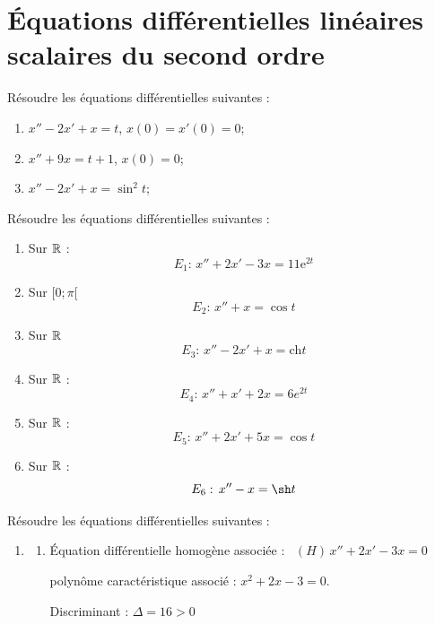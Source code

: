 \documentclass{book}
\begin{document}
\section*{Équations différentielles linéaires scalaires du second ordre}
\begin{Exercice}
Résoudre les équations différentielles suivantes :
\begin{enumerate}
\item $x''-2x'+x=t$, $x(0)=x'(0)=0$;
\item $x''+9x=t+1$, $x(0)=0$;
\item $x''-2x'+x=\sin^2 t$;
\end{enumerate}
\end{Exercice}
\begin{Exercice}
Résoudre les équations différentielles suivantes  :   
\begin{enumerate}
\item Sur $\mathbb{R}$ :
$$E_1 : \, x''+2x'-3x = 11   \mathrm{e}^{2t}      $$ %

\item Sur $[0 ; \pi[$
 $$E_2 : \, x''+x=  \cos t                  $$  %

\item Sur $\mathbb{R}$
$$E_3 : \, x''-2x'+x = \mathrm{ch} t$$

\item Sur $\mathbb{R}$ :
$$E_4 : \, x'' + x'+2x = 6 e^{2t}    $$ 

\item Sur $\mathbb{R}$ :
$$E_5 : \, x'' +  2x'+5x = \cos t    $$

\item Sur $\mathbb{R}$ :
$$E_6 : \, x'' - x = \sh t    $$ 
\end{enumerate} 
\begin{Correction}
Résoudre les équations différentielles suivantes  :   
\begin{enumerate}
\item %
	\begin{enumerate}
		\item  \'Equation différentielle homogène associée :  \, $ (H) \,x'' + 2x' - 3x = 0 $

			polynôme caractéristique associé : $x^2  + 2x - 3 = 0$.
			
			Discriminant : $\Delta = 16 > 0$


\end{enumerate}
\end{enumerate}
\end{Correction}
\end{Exercice}
\end{document}
